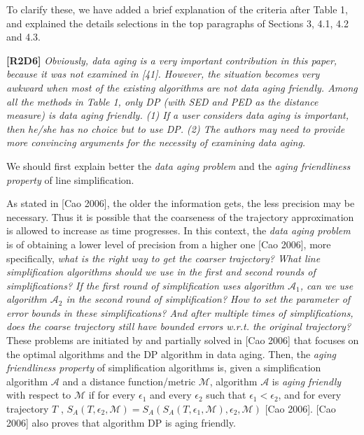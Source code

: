 \documentclass{letter}
\newcommand{\wrt}{\emph{w.r.t.}\xspace}
\begin{document}
To clarify these, we have added a brief explanation of the criteria after Table 1, and explained the details selections in the top paragraphs of Sections 3, 4.1, 4.2 and 4.3.

\textbf{[R2D6]} \emph{Obviously, data aging is a very important contribution in this paper, because it was not examined in [41]. However, the situation becomes very awkward when most of the existing algorithms are not data aging friendly. Among all the methods in Table 1, only DP (with SED and PED as the distance measure) is data aging friendly. (1) {If a user considers data aging is important, then he/she has no choice but to use DP}. (2) {The authors may need to provide more convincing arguments for the necessity of examining data aging}.}

We should first explain better the \emph{data aging problem} and the \emph{aging friendliness property} of line simplification.

As stated in [Cao 2006], the older the information gets, the less precision may be necessary. Thus it is possible that the coarseness of the trajectory approximation is allowed to increase as time progresses. In this context, the \emph{data aging problem} is of obtaining a lower level of precision from a higher one [Cao 2006], more specifically, \emph{what is the right way to get the coarser trajectory? What line simplification algorithms should we use in the first and second rounds of simplifications? If the first round of simplification uses algorithm $\mathcal{A}_1$, can we use algorithm $\mathcal{A}_2$ in the second round of simplification? How to set the parameter of error bounds in these simplifications? And after multiple times of simplifications, does the coarse trajectory still have bounded errors \wrt the original trajectory?} These problems are initiated by and partially solved in [Cao 2006] that focuses on the optimal algorithms and the DP algorithm in data aging.
Then, the \emph{aging friendliness property} of simplification algorithms is,  given a simplification algorithm $\mathcal{A}$ and a distance function/metric $\mathcal{M}$, algorithm $\mathcal{A}$ is \emph{aging friendly} with respect to  $\mathcal{M}$ if for every $\epsilon_1$ and every $\epsilon_2$ such that $\epsilon_1 <\epsilon_2$, and
for every trajectory $T$ , $S_A(T, \epsilon_2,\mathcal{M}) = S_A(S_A(T, \epsilon_1,\mathcal{M}), \epsilon_2, \mathcal{M})$ [Cao 2006]. [Cao 2006] also proves that algorithm DP is aging friendly.
\end{document}

